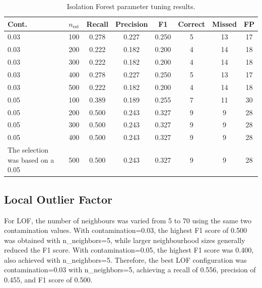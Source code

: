 \documentclass[a4paper,12pt]{article}
\begin{document}
\begin{table}
	\centering
	\small
	\setlength{\tabcolsep}{5pt}
	\caption{Isolation Forest parameter tuning results.}
	\label{tab:if_tuning}
	\begin{tabular}{llcccccc}
		\hline
		Cont. & $n_{\mathrm{est}}$ & Recall & Precision & F1 & Correct & Missed & FP \\
		\hline
		0.03 & 100 & 0.278 & 0.227 & 0.250 & 5 & 13 & 17 \\
		0.03 & 200 & 0.222 & 0.182 & 0.200 & 4 & 14 & 18 \\
		0.03 & 300 & 0.222 & 0.182 & 0.200 & 4 & 14 & 18 \\
		0.03 & 400 & 0.278 & 0.227 & 0.250 & 5 & 13 & 17 \\
		0.03 & 500 & 0.222 & 0.182 & 0.200 & 4 & 14 & 18 \\
		0.05 & 100 & 0.389 & 0.189 & 0.255 & 7 & 11 & 30 \\
		0.05 & 200 & 0.500 & 0.243 & 0.327 & 9 & 9 & 28 \\
		0.05 & 300 & 0.500 & 0.243 & 0.327 & 9 & 9 & 28 \\
		0.05 & 400 & 0.500 & 0.243 & 0.327 & 9 & 9 & 28 \\The selection was based on a
		0.05 & 500 & 0.500 & 0.243 & 0.327 & 9 & 9 & 28 \\
		\hline
	\end{tabular}
\end{table}

\subsection{Local Outlier Factor}

For LOF, the number of neighbours was varied from 5 to 70 using the same two contamination values. With contamination=0.03, the highest F1 score of 0.500 was obtained with n\_neighbors=5, while larger neighbourhood sizes generally reduced the F1 score. With contamination=0.05, the highest F1 score was 0.400, also achieved with n\_neighbors=5. Therefore, the best LOF configuration was contamination=0.03 with n\_neighbors=5, achieving a recall of 0.556, precision of 0.455, and F1 score of 0.500.
\end{document}

